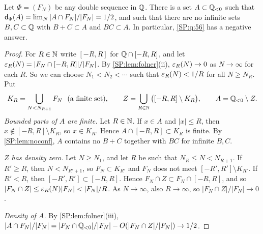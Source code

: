 \begin{theorem}\label{SP:thm:q56}
Let $\Phi=(F_N)$ be any double \Fol{} sequence in $\mathbb{Q}$. There is a set $A\subset\mathbb{Q}_{<0}$ such
that $\mathsf{d}_\Phi(A)=\lim_{N}|A\cap F_N|/|F_N|=1/2$, and such that there are no infinite sets
$B,C\subset\mathbb{Q}$ with $B+C\subset A$ and $BC\subset A$. In particular, \cref{SP:q:56} has a
negative answer.
\end{theorem}

\begin{proof}
For $R\in\mathbb{N}$ write $[-R,R]$ for $\mathbb{Q}\cap[-R,R]$, and let $\varepsilon_R(N)=|F_N\cap[-R,R]|/|F_N|$. By
\cref{SP:lem:folner}(ii), $\varepsilon_R(N)\to0$ as $N\to\infty$ for each $R$. So we can choose
$N_1<N_2<\cdots$ such that $\varepsilon_R(N)<1/R$ for all $N\ge N_R$. Put
\[
K_R=\bigcup_{N<N_{R+1}}F_N\ \ (\text{a finite set}),\qquad
Z=\bigcup_{R\in\N}\big([-R,R]\setminus K_R\big),\qquad A=\Q_{<0}\setminus Z .
\]
\emph{Bounded parts of $A$ are finite.} Let $R\in\mathbb{N}$. If $x\in A$ and $|x|\le R$, then
$x\notin[-R,R]\setminus K_R$, so $x\in K_R$. Hence $A\cap[-R,R]\subset K_R$ is finite. By
\cref{SP:lem:noconf}, $A$ contains no $B+C$ together with $BC$ for infinite $B,C$.

\emph{$Z$ has density zero.} Let $N\ge N_1$, and let $R$ be such that $N_R\le N<N_{R+1}$.
If $R'\ge R$, then $N<N_{R'+1}$, so $F_N\subset K_{R'}$ and $F_N$ does not meet
$[-R',R']\setminus K_{R'}$. If $R'<R$, then $[-R',R']\subset[-R,R]$. Hence
$F_N\cap Z\subset F_N\cap[-R,R]$, and so $|F_N\cap Z|\le\eps_R(N)|F_N|<|F_N|/R$. As
$N\to\infty$, also $R\to\infty$, so $|F_N\cap Z|/|F_N|\to0$.

\emph{Density of $A$.} By \cref{SP:lem:folner}(iii),
$|A\cap F_N|/|F_N|=|F_N\cap\mathbb{Q}_{<0}|/|F_N|-O(|F_N\cap Z|/|F_N|)\to1/2$.
\end{proof}


